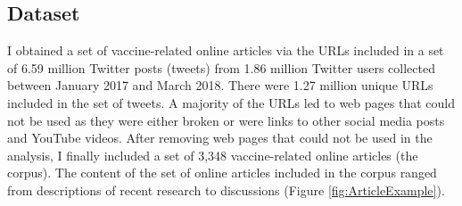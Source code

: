 \documentclass[a4paper,twoside,phd]{BYUPhys}
\begin{document}
\subsection{Dataset}
\label{sec:Dataset}

I obtained a set of vaccine-related online articles via the URLs included in a set of 6.59 million Twitter posts (tweets) from 1.86 million Twitter users collected between January 2017 and March 2018. There were 1.27 million unique URLs included in the set of tweets. A majority of the URLs led to web pages that could not be used as they were either broken or were links to other social media posts and YouTube videos. After removing web pages that could not be used in the analysis, I finally included a set of 3,348 vaccine-related online articles (the corpus). The content of the set of online articles included in the corpus ranged from descriptions of recent research to discussions (Figure \ref{fig:ArticleExample}). \newline
\end{document}
